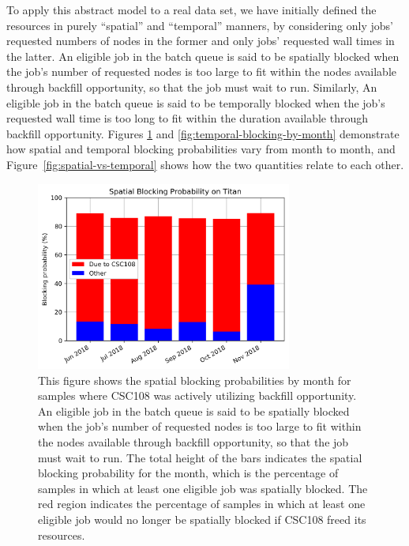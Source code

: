 To apply this abstract model to a real data set, we have initially defined the
resources in purely ``spatial'' and ``temporal'' manners, by considering only
jobs' requested numbers of nodes in the former and only jobs' requested wall
times in the latter. An eligible job in the batch queue is said to be spatially
blocked when the job’s number of requested nodes is too large to fit within the
nodes available through backfill opportunity, so that the job must wait to run.
Similarly, An eligible job in the batch queue is said to be temporally blocked
when the job’s requested wall time is too long to fit within the duration
available through backfill opportunity. Figures
\ref{fig:spatial-blocking-by-month} and \ref{fig:temporal-blocking-by-month}
demonstrate how spatial and temporal blocking probabilities vary from month to
month, and Figure~\ref{fig:spatial-vs-temporal} shows how the two quantities
relate to each other.

\begin{figure}
  \includegraphics[width=0.75\textwidth]{images/barplot-spatial-blocking-by-month.png}
\caption{This figure shows the spatial blocking probabilities by month for
samples where CSC108 was actively utilizing backfill opportunity. An eligible
job in the batch queue is said to be spatially blocked when the job's number of
requested nodes is too large to fit within the nodes available through backfill
opportunity, so that the job must wait to run. The total height of the bars
indicates the spatial blocking probability for the month, which is the
percentage of samples in which at least one eligible job was spatially blocked.
The red region indicates the percentage of samples in which at least one
eligible job would no longer be spatially blocked if CSC108 freed its
resources.}
\label{fig:spatial-blocking-by-month}
\end{figure}

